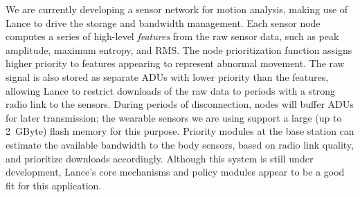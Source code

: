 We are currently developing a sensor network for motion analysis,
making use of Lance to drive the storage and bandwidth management.
Each sensor node computes a series of high-level {\em features} from
the raw sensor data, such as peak amplitude, maximum entropy, and
RMS. The node prioritization function assigns higher priority to 
features appearing to represent abnormal movement. The raw signal 
is also stored as separate ADUs with lower priority than the features,
allowing Lance to restrict downloads of the raw data to periods
with a strong radio link to the sensors. During periods of
disconnection, nodes will buffer ADUs for later transmission; the
wearable sensors we are using support a large (up to 2~GByte) flash
memory for this purpose. Priority modules at the base station can 
estimate the available bandwidth to the body sensors, based on radio
link quality, and prioritize downloads accordingly. Although this
system is still under development, Lance's core mechanisms and policy
modules appear to be a good fit for this application.


